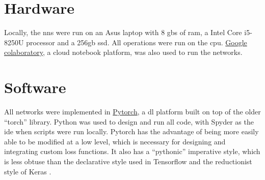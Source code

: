 
\section{Hardware}

Locally, the \gls{nn}s were run on an Asus laptop with 8 \gls{gb}s of \gls{ram}, a Intel Core i5-8250U processor and a 256\gls{gb} \gls{ssd}. All operations were run on the \gls{cpu}. \href{https://colab.research.google.com/}{Google colaboratory}, a cloud notebook platform, was also used to run the networks. 

\section{Software}

All networks were implemented in \href{https://pytorch.org/}{Pytorch}, a \gls{dl} platform built on top of the older \enquote{torch} library. Python was used to design and run all code, with Spyder as the \gls{ide} when scripts were run locally. Pytorch has the advantage of being more easily able to be modified at a low level, which is necessary for designing and integrating custom loss functions. It also has a \enquote{pythonic} imperative style, which is less obtuse than the declarative style used in Tensorflow and the reductionist style of Keras \cite{tale_dl}.
\bigskip

